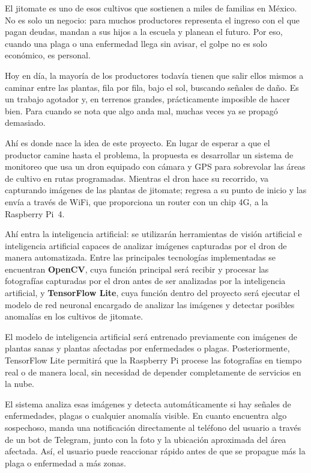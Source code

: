 
El jitomate es uno de esos cultivos que sostienen a miles de familias en México. No es solo un negocio: para muchos productores representa el ingreso con el que pagan deudas, mandan a sus hijos a la escuela y planean el futuro. Por eso, cuando una plaga o una enfermedad llega sin avisar, el golpe no es solo económico, es personal.

Hoy en día, la mayoría de los productores todavía tienen que salir ellos mismos a caminar entre las plantas, fila por fila, bajo el sol, buscando señales de daño. Es un trabajo agotador y, en terrenos grandes, prácticamente imposible de hacer bien. Para cuando se nota que algo anda mal, muchas veces ya se propagó demasiado.

Ahí es donde nace la idea de este proyecto. En lugar de esperar a que el productor camine hasta el problema, la propuesta es desarrollar un sistema de monitoreo que usa un dron equipado con cámara y GPS para sobrevolar las áreas de cultivo en rutas programadas. Mientras el dron hace su recorrido, va capturando imágenes de las plantas de jitomate; regresa a su punto de inicio y las envía a través de WiFi, que proporciona un router con un chip 4G, a la Raspberry Pi~4.

Ahí entra la inteligencia artificial: se utilizarán herramientas de visión artificial e inteligencia artificial capaces de analizar imágenes capturadas por el dron de manera automatizada. Entre las principales tecnologías implementadas se encuentran \textbf{OpenCV}, cuya función principal será recibir y procesar las fotografías capturadas por el dron antes de ser analizadas por la inteligencia artificial, y \textbf{TensorFlow Lite}, cuya función dentro del proyecto será ejecutar el modelo de red neuronal encargado de analizar las imágenes y detectar posibles anomalías en los cultivos de jitomate.

El modelo de inteligencia artificial será entrenado previamente con imágenes de plantas sanas y plantas afectadas por enfermedades o plagas. Posteriormente, TensorFlow Lite permitirá que la Raspberry Pi procese las fotografías en tiempo real o de manera local, sin necesidad de depender completamente de servicios en la nube.

El sistema analiza esas imágenes y detecta automáticamente si hay señales de enfermedades, plagas o cualquier anomalía visible. En cuanto encuentra algo sospechoso, manda una notificación directamente al teléfono del usuario a través de un bot de Telegram, junto con la foto y la ubicación aproximada del área afectada. Así, el usuario puede reaccionar rápido antes de que se propague más la plaga o enfermedad a más zonas.

